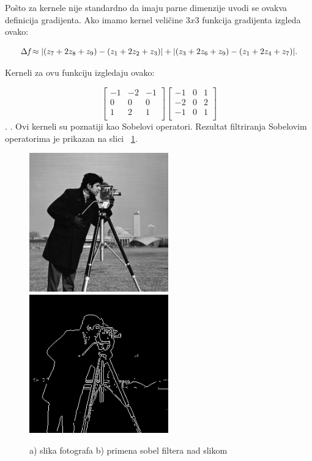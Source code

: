 \documentclass[a4paper,12pt,titlepage]{article}
\begin{document}
Pošto za kernele nije standardno da imaju parne dimenzije uvodi se ovakva definicija gradijenta. Ako imamo kernel veličine $3 x 3$ funkcija gradijenta izgleda ovako: 

\begin{equation}\label{eq:grad14}
\Delta \emph{f} \approx |(z_7 + 2z_8 + z_9) - (z_1 + 2z_2 + z_3)| + |(z_3 + 2z_6 + z_9) - (z_1 + 2z_4 + z_7)|.
\end{equation}

\newpage
Kerneli za ovu funkciju izgledaju ovako: 

\[
\begin{bmatrix}
-1 & -2 & -1 \\
0 & 0 & 0 \\
1 & 2 & 1 \\
\end{bmatrix}
\begin{bmatrix}
-1 & 0 & 1 \\
-2 & 0 & 2 \\
-1 & 0 & 1 \\
\end{bmatrix}
\].
.
Ovi kerneli su poznatiji kao Sobelovi operatori. Rezultat filtriranja Sobelovim operatorima je prikazan na slici ~\ref{sobel}.

\begin{figure}[ht!]
\centering
\includegraphics[width=60mm]{img/img.png}
\includegraphics[width=60mm]{img/imgSob.png}
\caption{a) slika fotografa b) primena sobel filtera nad slikom}
\label{sobel}
\end{figure}
\end{document}
